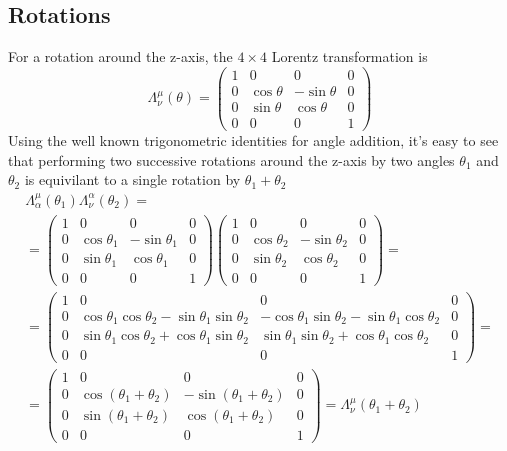 \documentclass{article}
\begin{document}
\subsection{Rotations}
For a rotation around the z-axis, the $4\times4$ Lorentz transformation is
\begin{equation}
    \Lambda^\mu_\nu(\theta) = \begin{pmatrix}
        1 & 0 & 0 & 0 \\
        0 & \cos\theta & -\sin\theta & 0 \\
        0 & \sin\theta & \cos\theta & 0 \\
        0 & 0 & 0 & 1
    \end{pmatrix}
\end{equation}
Using the well known trigonometric identities for angle addition, it's easy to see that performing two successive rotations around the z-axis by two angles $\theta_1$ and $\theta_2$ is equivilant to a single rotation by $\theta_1 + \theta_2$
\begin{equation}
\begin{gathered}
    \Lambda^\mu_\alpha(\theta_1) \Lambda^\alpha_\nu(\theta_2) =
    \\
    = \begin{pmatrix}
        1 & 0 & 0 & 0 \\
        0 & \cos\theta_1 & -\sin\theta_1 & 0 \\
        0 & \sin\theta_1 & \cos\theta_1 & 0 \\
        0 & 0 & 0 & 1
    \end{pmatrix} \begin{pmatrix}
        1 & 0 & 0 & 0 \\
        0 & \cos\theta_2 & -\sin\theta_2 & 0 \\
        0 & \sin\theta_2 & \cos\theta_2 & 0 \\
        0 & 0 & 0 & 1
    \end{pmatrix} = 
    \\
    = \begin{pmatrix}
        1 & 0 & 0 & 0 \\
        0 & \cos\theta_1\cos\theta_2 - \sin\theta_1\sin\theta_2 & -\cos\theta_1\sin\theta_2-\sin\theta_1\cos\theta_2 & 0 \\
        0 & \sin\theta_1\cos\theta_2 + \cos\theta_1\sin\theta_2 & \sin\theta_1\sin\theta_2 + \cos\theta_1\cos\theta_2 & 0 \\
        0 & 0 & 0 & 1
    \end{pmatrix} = 
    \\
    = \begin{pmatrix}
        1 & 0 & 0 & 0 \\
        0 & \cos\left(\theta_1+\theta_2\right) & -\sin\left(\theta_1+\theta_2\right) & 0 \\
        0 & \sin\left(\theta_1+\theta_2\right) & \cos\left(\theta_1+\theta_2\right) & 0 \\
        0 & 0 & 0 & 1
    \end{pmatrix} = \Lambda^\mu_\nu(\theta_1 + \theta_2)
\end{gathered}
\end{equation}
\end{document}
